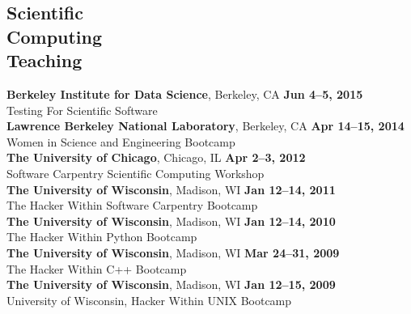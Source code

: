 \documentclass[margin,line]{resume}
\begin{document}
\begin{resume}
    \section{\mysidestyle Scientific\\Computing\\Teaching}
    \textbf{Berkeley Institute for Data Science}, Berkeley, CA \hfill \textbf{Jun 4--5, 2015}\\
    Testing For Scientific Software
               \vspace{2mm}\\
    \textbf{Lawrence Berkeley National Laboratory}, Berkeley, CA \hfill \textbf{Apr 14--15, 2014}\\
    Women in Science and Engineering Bootcamp
               \vspace{2mm}\\
    \textbf{The University of Chicago}, Chicago, IL \hfill \textbf{Apr 2--3, 2012}\\
    Software Carpentry Scientific Computing Workshop
               \vspace{2mm}\\
    \textbf{The University of Wisconsin}, Madison, WI \hfill\textbf{Jan 12--14, 2011}\\
    The Hacker Within Software Carpentry Bootcamp
               \vspace{2mm}\\
    \textbf{The University of Wisconsin}, Madison, WI \hfill \textbf{Jan 12--14, 2010}\\
    The Hacker Within Python Bootcamp
               \vspace{2mm}\\
    \textbf{The University of Wisconsin}, Madison, WI \hfill \textbf{Mar 24--31, 2009}\\
    The Hacker Within C++ Bootcamp
               \vspace{2mm}\\
    \textbf{The University of Wisconsin}, Madison, WI \hfill \textbf{Jan 12--15, 2009}\\
    University of Wisconsin, Hacker Within UNIX Bootcamp\\

\end{resume}
\end{document}
